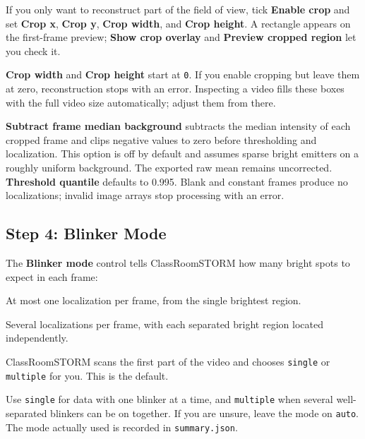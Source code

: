 \documentclass[11pt,a4paper]{article}
\newcommand{\ui}[1]{\textbf{#1}}
\newcommand{\file}[1]{\texttt{#1}}
\newcommand{\app}{ClassRoomSTORM}
\begin{document}
If you only want to reconstruct part of the field of view, tick \ui{Enable crop}
and set \ui{Crop x}, \ui{Crop y}, \ui{Crop width}, and \ui{Crop height}. A
rectangle appears on the first-frame preview; \ui{Show crop overlay} and
\ui{Preview cropped region} let you check it.

\begin{cswarn}
\ui{Crop width} and \ui{Crop height} start at \texttt{0}. If you enable cropping
but leave them at zero, reconstruction stops with an error. Inspecting a video
fills these boxes with the full video size automatically; adjust them from
there.
\end{cswarn}

\begin{csnote}
\ui{Subtract frame median background} subtracts the median intensity of each
cropped frame and clips negative values to zero before thresholding and
localization. This option is off by default and assumes sparse bright emitters on a
roughly uniform background. The exported raw mean remains uncorrected.
\ui{Threshold quantile} defaults to 0.995. Blank and constant frames produce
no localizations; invalid image arrays stop processing with an error.
\end{csnote}

\subsection{Step 4: Blinker Mode}
\label{sec:rc-mode}

The \ui{Blinker mode} control tells \app{} how many bright spots to expect in
each frame:

\begin{description}[style=unboxed,leftmargin=0pt]
  \item[\texttt{single}] At most one localization per frame, from the single brightest region.
  \item[\texttt{multiple}] Several localizations per frame, with each separated bright region located independently.
  \item[\texttt{auto}] \app{} scans the first part of the video and chooses
        \texttt{single} or \texttt{multiple} for you. This is the default.
\end{description}

\begin{cstip}
Use \texttt{single} for data with one blinker at a time, and \texttt{multiple}
when several well-separated blinkers can be on together. If you are unsure, leave the mode on \texttt{auto}. The mode actually used is recorded in \file{summary.json}.
\end{cstip}
\end{document}
